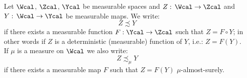 \begin{Not}
 Let $\Wcal$, $\Zcal$, $\Ycal$ be measurable spaces and $Z:\, \Wcal \to \Zcal$ and $Y:\,\Wcal \to \Ycal$ be measurable maps.
 We write:
 \[ Z \precsim Y  \]%
 if there exists a measurable function $F: \Ycal \to \Zcal$ %
 such that $Z= F \circ Y $; in other words if $Z$ is a deterministic (measurable) function of $Y$, i.e.: $Z=F(Y)$.\\
 If $\mu$ is a measure on $\Wcal$ we also write:
 \[ Z \precsim_\mu Y\]
 if there exists a measurable map $F$ such that $Z=F(Y)$ $\mu$-almost-surely.

\end{Not}

